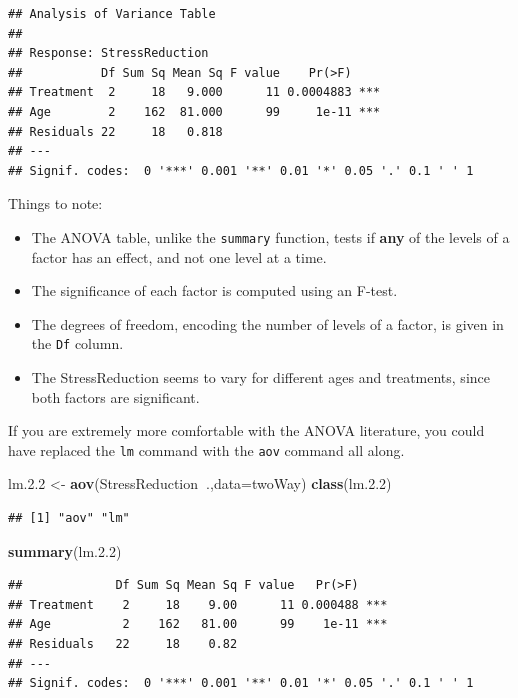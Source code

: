 \documentclass[]{book}
\newenvironment{Shaded}{\begin{snugshade}}{\end{snugshade}}
\newcommand{\KeywordTok}[1]{\textcolor[rgb]{0.13,0.29,0.53}{\textbf{#1}}}
\newcommand{\DataTypeTok}[1]{\textcolor[rgb]{0.13,0.29,0.53}{#1}}
\newcommand{\FloatTok}[1]{\textcolor[rgb]{0.00,0.00,0.81}{#1}}
\newcommand{\StringTok}[1]{\textcolor[rgb]{0.31,0.60,0.02}{#1}}
\newcommand{\OperatorTok}[1]{\textcolor[rgb]{0.81,0.36,0.00}{\textbf{#1}}}
\newcommand{\NormalTok}[1]{#1}
\providecommand{\tightlist}{%
  \setlength{\itemsep}{0pt}\setlength{\parskip}{0pt}}
\theoremstyle{definition}
\theoremstyle{definition}
\theoremstyle{definition}
\theoremstyle{remark}
\begin{document}
\begin{verbatim}
## Analysis of Variance Table
## 
## Response: StressReduction
##           Df Sum Sq Mean Sq F value    Pr(>F)    
## Treatment  2     18   9.000      11 0.0004883 ***
## Age        2    162  81.000      99     1e-11 ***
## Residuals 22     18   0.818                      
## ---
## Signif. codes:  0 '***' 0.001 '**' 0.01 '*' 0.05 '.' 0.1 ' ' 1
\end{verbatim}

Things to note:

\begin{itemize}
\tightlist
\item
  The ANOVA table, unlike the \texttt{summary} function, tests if
  \textbf{any} of the levels of a factor has an effect, and not one
  level at a time.
\item
  The significance of each factor is computed using an F-test.
\item
  The degrees of freedom, encoding the number of levels of a factor, is
  given in the \texttt{Df} column.
\item
  The StressReduction seems to vary for different ages and treatments,
  since both factors are significant.
\end{itemize}

If you are extremely more comfortable with the ANOVA literature, you
could have replaced the \texttt{lm} command with the \texttt{aov}
command all along.

\begin{Shaded}
\begin{Highlighting}[]
\NormalTok{lm.}\FloatTok{2.2}\NormalTok{ <-}\StringTok{ }\KeywordTok{aov}\NormalTok{(StressReduction}\OperatorTok{~}\NormalTok{.,}\DataTypeTok{data=}\NormalTok{twoWay)}
\KeywordTok{class}\NormalTok{(lm.}\FloatTok{2.2}\NormalTok{)}
\end{Highlighting}
\end{Shaded}

\begin{verbatim}
## [1] "aov" "lm"
\end{verbatim}

\begin{Shaded}
\begin{Highlighting}[]
\KeywordTok{summary}\NormalTok{(lm.}\FloatTok{2.2}\NormalTok{)}
\end{Highlighting}
\end{Shaded}

\begin{verbatim}
##             Df Sum Sq Mean Sq F value   Pr(>F)    
## Treatment    2     18    9.00      11 0.000488 ***
## Age          2    162   81.00      99    1e-11 ***
## Residuals   22     18    0.82                     
## ---
## Signif. codes:  0 '***' 0.001 '**' 0.01 '*' 0.05 '.' 0.1 ' ' 1
\end{verbatim}
\end{document}
